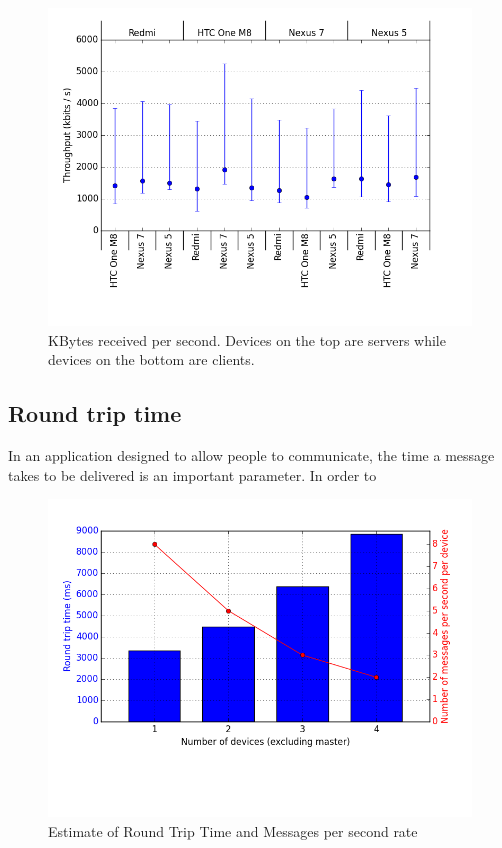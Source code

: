 \begin{figure}[ht!]
  \centering
  \includegraphics[width=1.0\textwidth]{img/throughput.png} 
  \caption{KBytes received per second. Devices on the top are servers while devices on the bottom are clients.}
  \label{figure:throughput}
\end{figure}

\subsection{Round trip time}
In an application designed to allow people to communicate, the time a message takes to be delivered is an important parameter.
In order to 


\begin{figure}[ht!]
  \centering
  \includegraphics[width=1.0\textwidth]{img/messages_per_second.png} 
  \caption{Estimate of Round Trip Time and Messages per second rate}
  \label{figure:messages-per-second}
\end{figure}